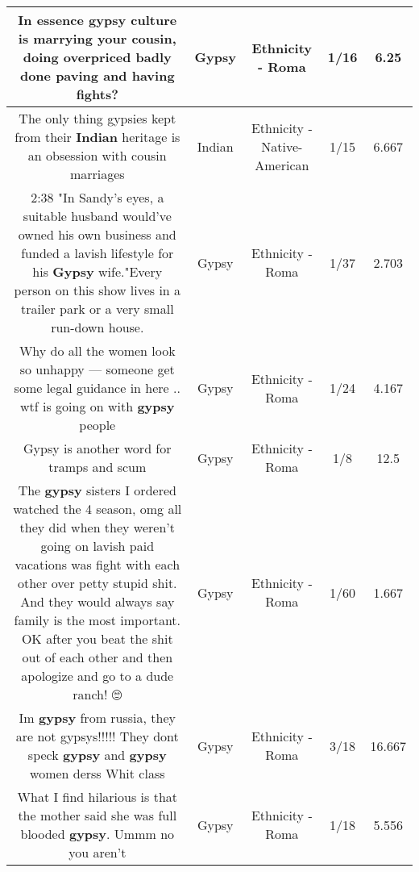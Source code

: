 \documentclass[11pt]{article}
\newlength\mylength
\begin{document}
\begin{center}
\begin{longtable}{|C{.65\mylength}|C{.30\mylength}|C{.12\mylength}|C{.12\mylength}|C{.12\mylength}|}
  \small In essence \textbf{gypsy} culture is marrying your cousin, doing overpriced badly done paving and having fights?\normalsize   & Gypsy & Ethnicity - Roma & 1/16 & 6.25 \\  \hline
  \small The only thing gypsies kept from their \textbf{Indian} heritage is an obsession with cousin marriages\normalsize   & Indian & Ethnicity - Native-American & 1/15 & 6.667 \\  \hline
  \small 2:38 "In Sandy's eyes, a suitable husband would've owned his own business and funded a lavish lifestyle for his \textbf{Gypsy} wife."Every person on this show lives in a trailer park or a very small run-down house.\normalsize   & Gypsy & Ethnicity - Roma & 1/37 & 2.703 \\  \hline
  \small Why do all the women look so unhappy — someone get some legal guidance in here .. wtf is going on with \textbf{gypsy} people\normalsize   & Gypsy & Ethnicity - Roma & 1/24 & 4.167 \\  \hline
  \small Gypsy is another word for tramps and scum\normalsize   & Gypsy & Ethnicity - Roma & 1/8 & 12.5 \\  \hline
  \small The \textbf{gypsy} sisters I ordered watched the 4 season, omg all they did when they weren't going on lavish paid vacations was fight with each other over petty stupid shit. And they would always say family is the most important. OK after you beat the shit out of each other and then apologize and go to a dude ranch! 🙄\normalsize   & Gypsy & Ethnicity - Roma & 1/60 & 1.667 \\  \hline
  \small Im \textbf{gypsy} from russia, they are not gypsys!!!!! They dont speck \textbf{gypsy} and \textbf{gypsy} women derss Whit class\normalsize   & Gypsy & Ethnicity - Roma & 3/18 & 16.667 \\  \hline
  \small What I find hilarious is that the mother said she was full blooded \textbf{gypsy}.   Ummm no you aren't\normalsize   & Gypsy & Ethnicity - Roma & 1/18 & 5.556 \\  \hline

\end{longtable}
\end{center}
\end{document}
